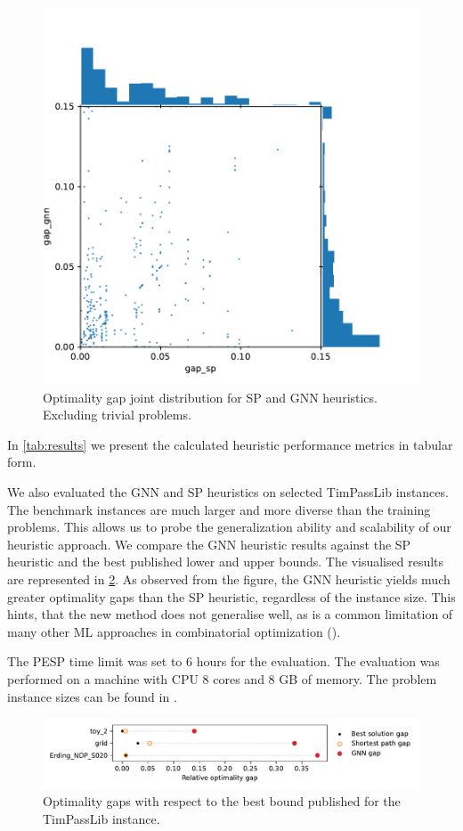 \documentclass[english, 12pt, a4paper, sci, utf8, a-2b, online]{aaltothesis}
\begin{document}
\begin{figure}[h]
    \centering
    \includegraphics[width=0.75\linewidth]{figures/gap-gap-excl-trivials.pdf}
    \caption{Optimality gap joint distribution for SP and GNN heuristics. Excluding trivial problems.}
    \label{fig:results-gg-excl-trivial}
\end{figure}

In \cref{tab:results} we present the calculated heuristic performance metrics in tabular form. 

We also evaluated the GNN and SP heuristics on selected TimPassLib instances. The benchmark instances are much larger and more diverse than the training problems. This allows us to probe the generalization ability and scalability of our heuristic approach. We compare the GNN heuristic results against the SP heuristic and the best published lower and upper bounds. The visualised results are represented in \cref{fig:eval-timpasslib}. As observed from the figure, the GNN heuristic yields much greater optimality gaps than the SP heuristic, regardless of the instance size. This hints, that the new method does not generalise well, as is a common limitation of many other ML approaches in combinatorial optimization (\cite{cappart2023combinatorial}).


The PESP time limit was set to 6 hours for the evaluation. The evaluation was performed on a machine with CPU 8 cores and 8 GB of memory. The problem instance sizes can be found in \cite{schiewe2023introducing}.

\begin{figure}
    \centering
    \includegraphics[width=\linewidth]{figures/eval-timpasslib.pdf}
    \caption{Optimality gaps with respect to the best bound published for the TimPassLib instance.} 
    \label{fig:eval-timpasslib}
\end{figure}
\end{document}
